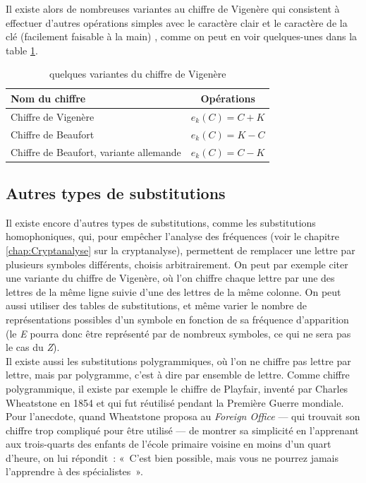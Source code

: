 Il existe alors de nombreuses variantes au chiffre de Vigenère qui
consistent à effectuer d'autres opérations simples avec le caractère
clair et le caractère de la clé (facilement faisable à la main) ,
comme on peut en voir quelques-unes dans la table \ref{tab:VariantesVigenere}. 
\begin{table}[h]
  \caption{quelques variantes du chiffre de Vigenère}
  \label{tab:VariantesVigenere}
  \begin{center}
    \begin{tabular}{|l|c|}
      \hline
      \textbf{Nom du chiffre} & \textbf{Opérations} \\
      \hline
      Chiffre de Vigenère & $e_k(C) = C + K$ \\ 
      \hline
      Chiffre de Beaufort & $e_k(C) = K - C$ \\
      \hline
      Chiffre de Beaufort, variante allemande & $e_k(C) = C - K$ \\
      \hline
    \end{tabular}
  \end{center}
\end{table}

\subsection{Autres types de substitutions\label{sec:SubstitutionsPolygrammiques}}
Il existe encore d'autres types de substitutions, comme les
substitutions homophoniques, qui, pour empêcher l'analyse des
fréquences (voir le chapitre \ref{chap:Cryptanalyse} sur la
cryptanalyse), permettent de remplacer une lettre par plusieurs
symboles différents, choisis arbitrairement. On peut par exemple citer
une variante du chiffre de Vigenère, où l'on chiffre chaque lettre par
une des lettres de la même ligne suivie d'une des lettres de la même
colonne. On peut aussi utiliser des tables de substitutions, et même
varier le nombre de représentations possibles d'un symbole en fonction
de sa fréquence d'apparition (le \emph{E} pourra donc être représenté par
de nombreux symboles, ce qui ne sera pas le cas du \emph{Z}).\\

Il existe aussi les substitutions polygrammiques, où l'on ne chiffre
pas lettre par lettre, mais par polygramme, c'est à dire par ensemble
de lettre. Comme chiffre polygrammique, il existe par exemple le
chiffre de Playfair, inventé par Charles Wheatstone en 1854 et qui fut
réutilisé pendant la Première Guerre mondiale. Pour l'anecdote,
quand Wheatstone proposa au \emph{Foreign Office} --- qui trouvait son chiffre
trop compliqué pour être utilisé --- de montrer sa simplicité en
l'apprenant aux trois-quarts des enfants de l'école primaire voisine
en moins d'un quart d'heure, on lui répondit~: «~C'est bien possible,
mais vous ne pourrez jamais l'apprendre à des spécialistes~».


